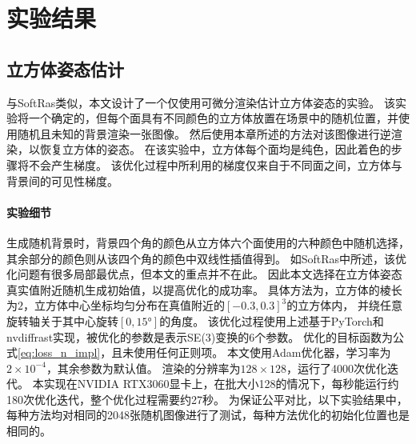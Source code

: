 \section{实验结果}

\subsection{立方体姿态估计}

与SoftRas\citep{softras}类似，本文设计了一个仅使用可微分渲染估计立方体姿态的实验。
该实验将一个确定的，但每个面具有不同颜色的立方体放置在场景中的随机位置，并使用随机且未知的背景渲染一张图像。
然后使用本章所述的方法对该图像进行逆渲染，以恢复立方体的姿态。
在该实验中，立方体每个面均是纯色，因此着色的步骤将不会产生梯度。
该优化过程中所利用的梯度仅来自于不同面之间，立方体与背景间的可见性梯度。

\paragraph{实验细节}
生成随机背景时，背景四个角的颜色从立方体六个面使用的六种颜色中随机选择，
其余部分的颜色则从该四个角的颜色中双线性插值得到。
如SoftRas中所述，该优化问题有很多局部最优点，但本文的重点并不在此。
因此本文选择在立方体姿态真实值附近随机生成初始值，以提高优化的成功率。
具体方法为，立方体的棱长为$2$，立方体中心坐标均匀分布在真值附近的$[-0.3,0.3]^3$的立方体内，
并绕任意旋转轴关于其中心旋转$[0,15°]$的角度。
该优化过程使用上述基于PyTorch\citep{pytorch}和nvdiffrast实现，被优化的参数是表示SE(3)变换的6个参数。
优化的目标函数为公式\eqref{eq:loss_n_impl}，且未使用任何正则项。
本文使用Adam\citep{adam}优化器，学习率为$2\times 10^{-4}$，其余参数为默认值。
渲染的分辨率为$128\times128$，运行了4000次优化迭代。
本实现在NVIDIA RTX3060显卡上，在批大小128的情况下，每秒能运行约180次优化迭代，整个优化过程需要约27秒。
为保证公平对比，以下实验结果中，每种方法均对相同的2048张随机图像进行了测试，每种方法优化的初始化位置也是相同的。

